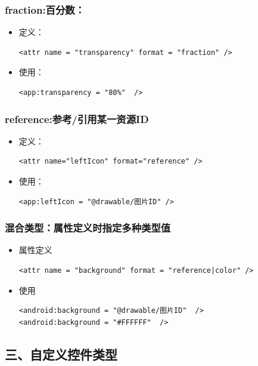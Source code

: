 \documentclass[9pt, b5paper]{article}
\begin{document}
\subsubsection{fraction:百分数：}
\label{sec-1-2-5}
\begin{itemize}
\item 定义：
\begin{verbatim}
<attr name = "transparency" format = "fraction" />
\end{verbatim}
\item 使用：
\begin{verbatim}
<app:transparency = "80%"  />
\end{verbatim}
\end{itemize}
\subsubsection{reference:参考/引用某一资源ID}
\label{sec-1-2-6}
\begin{itemize}
\item 定义：
\begin{verbatim}
<attr name="leftIcon" format="reference" />
\end{verbatim}
\item 使用：
\begin{verbatim}
<app:leftIcon = "@drawable/图片ID" />
\end{verbatim}
\end{itemize}
\subsubsection{混合类型：属性定义时指定多种类型值}
\label{sec-1-2-7}
\begin{itemize}
\item 属性定义
\begin{verbatim}
<attr name = "background" format = "reference|color" />
\end{verbatim}
\item 使用
\begin{verbatim}
<android:background = "@drawable/图片ID"  />
<android:background = "#FFFFFF"  />
\end{verbatim}
\end{itemize}
\subsection{三、自定义控件类型}
\label{sec-1-3}
\end{document}

